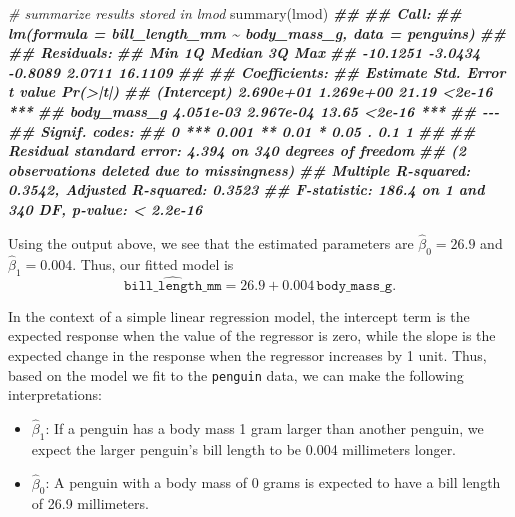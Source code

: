 \documentclass[
]{book}
\newenvironment{Shaded}{\begin{snugshade}}{\end{snugshade}}
\newcommand{\CommentTok}[1]{\textcolor[rgb]{0.56,0.35,0.01}{\textit{#1}}}
\newcommand{\DocumentationTok}[1]{\textcolor[rgb]{0.56,0.35,0.01}{\textbf{\textit{#1}}}}
\newcommand{\FunctionTok}[1]{\textcolor[rgb]{0.00,0.00,0.00}{#1}}
\newcommand{\NormalTok}[1]{#1}
\providecommand{\tightlist}{%
  \setlength{\itemsep}{0pt}\setlength{\parskip}{0pt}}
\theoremstyle{definition}
\theoremstyle{definition}
\theoremstyle{definition}
\theoremstyle{definition}
\theoremstyle{remark}
\begin{document}
\begin{Shaded}
\begin{Highlighting}[]
\CommentTok{\# summarize results stored in lmod}
\FunctionTok{summary}\NormalTok{(lmod)}
\DocumentationTok{\#\# }
\DocumentationTok{\#\# Call:}
\DocumentationTok{\#\# lm(formula = bill\_length\_mm \textasciitilde{} body\_mass\_g, data = penguins)}
\DocumentationTok{\#\# }
\DocumentationTok{\#\# Residuals:}
\DocumentationTok{\#\#      Min       1Q   Median       3Q      Max }
\DocumentationTok{\#\# {-}10.1251  {-}3.0434  {-}0.8089   2.0711  16.1109 }
\DocumentationTok{\#\# }
\DocumentationTok{\#\# Coefficients:}
\DocumentationTok{\#\#              Estimate Std. Error t value Pr(\textgreater{}|t|)    }
\DocumentationTok{\#\# (Intercept) 2.690e+01  1.269e+00   21.19   \textless{}2e{-}16 ***}
\DocumentationTok{\#\# body\_mass\_g 4.051e{-}03  2.967e{-}04   13.65   \textless{}2e{-}16 ***}
\DocumentationTok{\#\# {-}{-}{-}}
\DocumentationTok{\#\# Signif. codes:  }
\DocumentationTok{\#\# 0 \textquotesingle{}***\textquotesingle{} 0.001 \textquotesingle{}**\textquotesingle{} 0.01 \textquotesingle{}*\textquotesingle{} 0.05 \textquotesingle{}.\textquotesingle{} 0.1 \textquotesingle{} \textquotesingle{} 1}
\DocumentationTok{\#\# }
\DocumentationTok{\#\# Residual standard error: 4.394 on 340 degrees of freedom}
\DocumentationTok{\#\#   (2 observations deleted due to missingness)}
\DocumentationTok{\#\# Multiple R{-}squared:  0.3542, Adjusted R{-}squared:  0.3523 }
\DocumentationTok{\#\# F{-}statistic: 186.4 on 1 and 340 DF,  p{-}value: \textless{} 2.2e{-}16}
\end{Highlighting}
\end{Shaded}

Using the output above, we see that the estimated parameters are \(\hat{\beta}_0=26.9\) and \(\hat{\beta}_1=0.004\). Thus, our fitted model is
\[
\widehat{\mathtt{bill\_length\_mm}}=26.9+0.004 \,\mathtt{body\_mass\_g}.
\]

In the context of a simple linear regression model, the intercept term is the expected response when the value of the regressor is zero, while the slope is the expected change in the response when the regressor increases by 1 unit. Thus, based on the model we fit to the \texttt{penguin} data, we can make the following interpretations:

\begin{itemize}
\tightlist
\item
  \(\hat{\beta}_1\): If a penguin has a body mass 1 gram larger than another penguin, we expect the larger penguin's bill length to be 0.004 millimeters longer.
\item
  \(\hat{\beta}_0\): A penguin with a body mass of 0 grams is expected to have a bill length of 26.9 millimeters.
\end{itemize}
\end{document}
